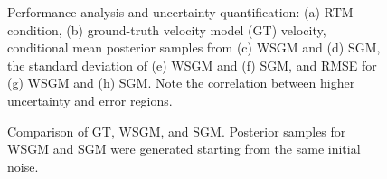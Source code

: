 \documentclass{IMAGE2025}
\begin{document}
\begin{figure}


\caption{\label{fig-performance}Performance analysis and uncertainty
quantification: (a) RTM condition, (b) ground-truth velocity model (GT)
velocity, conditional mean posterior samples from (c) WSGM and (d) SGM,
the standard deviation of (e) WSGM and (f) SGM, and RMSE for (g) WSGM
and (h) SGM. Note the correlation between higher uncertainty and error
regions.}

\end{figure}%

\begin{figure}


\caption{\label{fig-comparison}Comparison of GT, WSGM, and SGM.
Posterior samples for WSGM and SGM were generated starting from the same
initial noise.}

\end{figure}%
\end{document}
